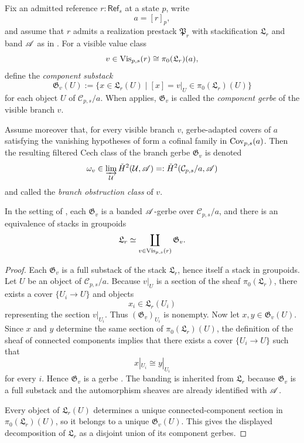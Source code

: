 \begin{definition}\label{def:compatible-realization-stack}\label{def:cech-gluing-obstruction}
Fix an admitted reference $r:\mathsf{Ref}_s$ at a state $p$, write
\[
a=[r]_p,
\]
and assume that $r$ admits a realization prestack $\mathfrak P_r$ with stackification $\mathfrak L_r$ and band $\mathscr{A}$ as in . For a visible value class
\[
v\in \mathrm{Vis}_{p,s}(r)\cong \pi_0(\mathfrak L_r)(a),
\]
define the \emph{component substack}
\[
\mathfrak G_v(U):=\{x\in \mathfrak L_r(U)\mid [x]=v|_U\in \pi_0(\mathfrak L_r)(U)\}
\]
for each object $U$ of $\mathcal C_{p,s}/a$. When  applies, $\mathfrak G_v$ is called the \emph{component gerbe} of the visible branch $v$.

Assume moreover that, for every visible branch $v$, gerbe-adapted covers of $a$ satisfying the vanishing hypotheses of  form a cofinal family in $\mathrm{Cov}_{p,s}(a)$. Then the resulting filtered Cech class of the branch gerbe $\mathfrak G_v$ is denoted
\[
\omega_v\in \varinjlim_{\mathcal U}\check{H}^2(\mathcal U,\mathscr{A})=:\check{H}^2(\mathcal C_{p,s}/a,\mathscr{A})
\]
and called the \emph{branch obstruction class} of $v$.
\end{definition}

\begin{theorem}\label{thm:component-gerbe-decomposition}
In the setting of , each $\mathfrak G_v$ is a banded $\mathscr{A}$-gerbe over $\mathcal C_{p,s}/a$, and there is an equivalence of stacks in groupoids
\[
\mathfrak L_r\simeq \coprod_{v\in \mathrm{Vis}_{p,s}(r)} \mathfrak G_v.
\]
\end{theorem}

\begin{proof}
Each $\mathfrak G_v$ is a full substack of the stack $\mathfrak L_r$, hence itself a stack in groupoids. Let $U$ be an object of $\mathcal C_{p,s}/a$. Because $v|_U$ is a section of the sheaf $\pi_0(\mathfrak L_r)$, there exists a cover $\{U_i\to U\}$ and objects
\[
x_i\in \mathfrak L_r(U_i)
\]
representing the section $v|_{U_i}$. Thus $(\mathfrak G_v)_{U_i}$ is nonempty. Now let $x,y\in \mathfrak G_v(U)$. Since $x$ and $y$ determine the same section of $\pi_0(\mathfrak L_r)(U)$, the definition of the sheaf of connected components implies that there exists a cover $\{U_i\to U\}$ such that
\[
x|_{U_i}\cong y|_{U_i}
\]
for every $i$. Hence $\mathfrak G_v$ is a gerbe \cite[Tag 06NY]{StacksProject}. The banding is inherited from $\mathfrak L_r$ because $\mathfrak G_v$ is a full substack and the automorphism sheaves are already identified with $\mathscr{A}$.

Every object of $\mathfrak L_r(U)$ determines a unique connected-component section in $\pi_0(\mathfrak L_r)(U)$, so it belongs to a unique $\mathfrak G_v(U)$. This gives the displayed decomposition of $\mathfrak L_r$ as a disjoint union of its component gerbes.
\end{proof}

